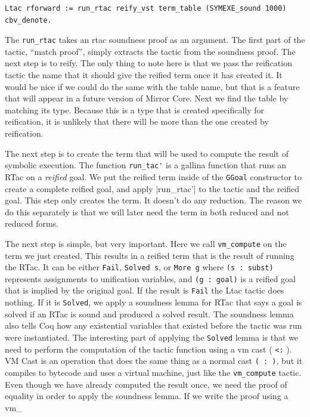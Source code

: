 \documentclass{puthesis}
\begin{document}
\begin{lstlisting}
Ltac rforward := run_rtac reify_vst term_table (SYMEXE_sound 1000) cbv_denote.
\end{lstlisting}

The \lstinline|run_rtac| takes an rtac soundness proof as an
argument. The first part of the tactic, ``match proof'', simply
extracts the tactic from the soundness proof. The next step is to
reify. The only thing to note here is that we pass the reification
tactic the name that it should give the reified term once it has
created it. It would be nice if we could do the same with the table
name, but that is a feature that will appear in a future version of
Mirror Core. Next we find the table by matching its type. Because this
is a type that is created specifically for reification, it is
unlikely that there will be more than the one created by reification. 

The next step is to create the term that will be used to compute the
result of symbolic execution. The function \lstinline|run_tac'| is a
gallina function that runs an RTac on a \emph{reified} goal. We put
the reified term inside of the \lstinline|GGoal| constructor to create
a complete reified goal, and apply \lstinlin|run_rtac'| to the tactic
and the reified goal.  This step only creates the term. It doesn't do
any reduction. The reason we do this separately is that we will later
need the term in both reduced and not reduced forms. 

The next step is simple, but very important. Here we call
\lstinline|vm_compute| on the term we just created. This results in a
reified term that is the result of running the RTac. It can be either
\lstinline|Fail|, \lstinline|Solved s|, or \lstinline|More g| where
\lstinline|(s : subst)| represents assignments to unification
variables, and \lstinline|(g : goal)| is a reified goal that is
implied by the original goal. If the result is \lstinline|Fail| the
Ltac tactic does nothing. If it is \lstinline|Solved|, we apply a
soundness lemma for RTac that says a goal is solved if an
RTac is sound and produced a solved result. The soundness lemma also
tells Coq how any existential variables that existed before the tactic was run
were instantiated. The interesting part of applying the
\lstinline|Solved| lemma is that we need to perform the computation of
the tactic function using a vm cast ( \lstinline|<:| ). VM Cast is an
operation that does the same thing as a normal cast \lstinline|( : )|,
but it compiles to bytecode and uses a virtual machine, just like the
\lstinline|vm_compute| tactic. 
Even though we have
already computed the result once, we need the proof of equality in
order to apply the soundness lemma. If we write the proof using a vm_
\end{document}
